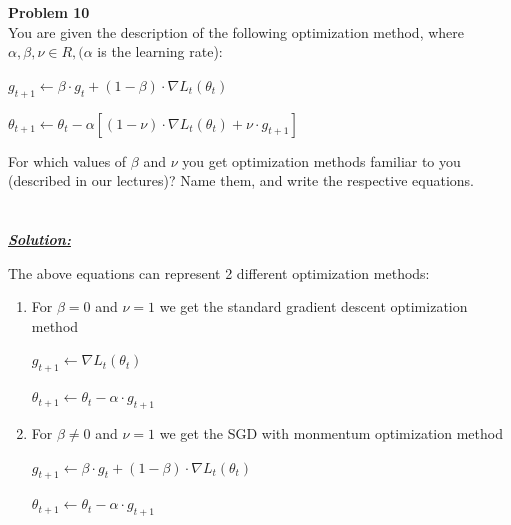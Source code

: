 \documentclass{article}
\begin{document}
\newpage
\noindent \textbf{Problem 10} \\

\noindent You are given the description of the following optimization method, where $ \alpha, \beta, \nu \in R, (\alpha $
is the learning rate):

\begin{center}
$g_{t+1} \leftarrow \beta \cdot g_t + (1 - \beta) \cdot \nabla L_t(\theta_t) $
\end{center}
\begin{center}
$\theta_{t+1} \leftarrow \theta_t - \alpha \left[ (1 - \nu) \cdot \nabla L_t(\theta_t) + \nu \cdot g_{t+1} \right] $
\end{center}

\noindent For which values of $ \beta $ and $\nu$ you get optimization methods familiar to you (described in
our lectures)? Name them, and write the respective equations.\\ \\ \\

\noindent \underline{\textbf{\textit{Solution:}}}

\noindent The above equations can represent 2 different optimization methods:

\begin{enumerate}
  \item For $\beta = 0$ and $\nu = 1$  we get the standard gradient descent optimization method
    \begin{center}
    $g_{t+1} \leftarrow \nabla L_t(\theta_t) $
    \end{center}
    \begin{center}
    $\theta_{t+1} \leftarrow \theta_t - \alpha \cdot g_{t+1}$
    \end{center}
    
  \item For $\beta \neq 0$ and $\nu = 1$ we get the SGD with monmentum optimization method
    \begin{center}
    $g_{t+1} \leftarrow \beta \cdot g_t + (1 - \beta) \cdot \nabla L_t(\theta_t) $
    \end{center}
    \begin{center}
      $\theta_{t+1} \leftarrow \theta_t - \alpha \cdot g_{t+1} $
    \end{center}
  \end{enumerate}
  
\end{document}
